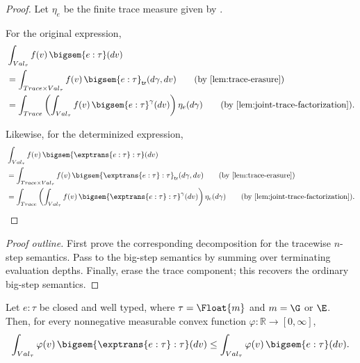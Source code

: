 \begin{proof}
  Let $\eta_e$ be the finite trace measure given by
  .

  For the original expression,
  \begin{align}
    &\int_{Val_\tau}
      f(v)\,
      \bigsem{e:\tau}(dv)
    \notag
    \\
    &=
    \int_{Trace\times Val_\tau}
      f(v)\,
      \bigsem{e:\tau}_{\mathsf{tr}}(d\gamma,dv)
    \tag{\text{by \Cref{lem:trace-erasure}}}
    \\
    &=
    \int_{Trace}
      \left(
        \int_{Val_\tau}
          f(v)\,
          \bigsem{e:\tau}^{\gamma}(dv)
      \right)
      \eta_e(d\gamma)
    \tag{\text{by \Cref{lem:joint-trace-factorization}}}.
  \end{align}

  Likewise, for the determinized expression,
  \begin{align}
    &\int_{Val_\tau}
      f(v)\,
      \bigsem{\exptrans{e:\tau}:\tau}(dv)
    \notag
    \\
    &=
    \int_{Trace\times Val_\tau}
      f(v)\,
      \bigsem{\exptrans{e:\tau}:\tau}_{\mathsf{tr}}(d\gamma,dv)
    \tag{\text{by \Cref{lem:trace-erasure}}}
    \\
    &=
    \int_{Trace}
      \left(
        \int_{Val_\tau}
          f(v)\,
          \bigsem{\exptrans{e:\tau}:\tau}^{\gamma}(dv)
      \right)
      \eta_e(d\gamma)
    \tag{\text{by \Cref{lem:joint-trace-factorization}}}.
  \end{align}
\end{proof}



\begin{proof}[Proof outline]
  First prove the corresponding decomposition for the tracewise
  $n$-step semantics. Pass to the big-step semantics by summing over
  terminating evaluation depths. Finally, erase the trace component;
  this recovers the ordinary big-step semantics.
\end{proof}







\begin{theorem}
  \label{thm:global-convex-domination}
  Let $e:\tau$ be closed and well typed, where
  $\tau=\Float{m}$ and $m=\G$ or $\E$.
  Then, for every nonnegative measurable convex function
  $\varphi:\mathbb R\to[0,\infty]$,
  \[
    \int_{Val_\tau}
      \varphi(v)\,
      \bigsem{\exptrans{e:\tau}:\tau}(dv)
    \leq
    \int_{Val_\tau}
      \varphi(v)\,
      \bigsem{e:\tau}(dv).
  \]
\end{theorem}

